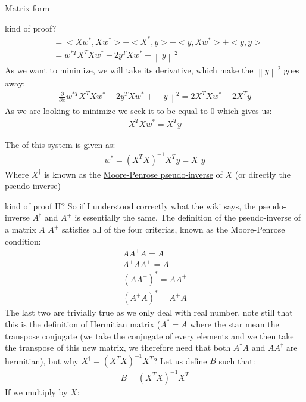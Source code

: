 \begin{parag}{Matrix form}
\begin{subparag}{kind of proof?}
\begin{align*}
											   &= <Xw^{\ast}, Xw^{\ast}> - <X^{\ast}, y> - <y, Xw^{\ast}> + <y, y>\\
											   &= w^{\ast T}X^{T}Xw^{\ast} - 2y^{T}Xw^{\ast} + \left\|y\right\|^2
			\end{align*}
			As we want to minimize, we will take its derivative, which make the $\left\|y\right\|^2$ goes away:
			\begin{align*} 
				\frac{\partial }{\partial x} w^{\ast T}X^{T}Xw^{\ast} - 2y^{T}Xw^{\ast} + \left\|y\right\|^2 = 2X^{T}Xw^{\ast} - 2X^{T}y
			\end{align*}
			As we are looking to minimize we seek it to be equal to $0$ which gives us:
			\begin{align*} 
				X^{T}Xw^{\ast} =  X^{T}y
			\end{align*}
		\end{subparag}
		The  of this system is given as:
		\begin{align*} 
			w^{\ast} = \left(X^TX\right)^{-1}X^{T}y = X^{\dagger}y
		\end{align*}
		Where $X^{\dagger}$ is known as the \href{https://en.wikipedia.org/wiki/Moore\%E2\%80\%93Penrose_inverse}{Moore-Penrose pseudo-inverse} of $X$ (or directly the pseudo-inverse)
		\begin{subparag}{kind of proof II?}
		    So if I understood correctly what the wiki says, the pseudo-inverse $A^{\dagger}$ and $A^{+}$ is essentially the same. The definition of the pseudo-inverse of a matrix $A$ $A^{+}$ satisfies all of the four criterias, known as the Moore-Penrose condition:
			\begin{align*} 
				A A^{+}A = A\\
				A^{+}A A^{+} = A^{+}\\
				\left(A A^{+}\right)^{\ast} =  A A^{+}\\
				\left(A^{+}A\right)^{\ast} =  A^{+}A
			\end{align*}
			The last two are trivially true as we only deal with real number, note still that this is the definition of Hermitian matrix ($A^{\ast} = A$ where the star mean the transpose conjugate (we take the conjugate of every elements and we then take the transpose of this new matrix, we therefore need that both $A^{\dagger}A$ and $A A^{\dagger}$ are hermitian), but why $X^{\dagger} = \left(X^{T}X\right)^{-1}X^{T}$?
			Let us define $B$ such that:
			\begin{align*} B =  \left(X^{T}X\right)^{-1}X^{T} \end{align*}
			If we multiply by $X$:

\end{subparag}
\end{parag}
